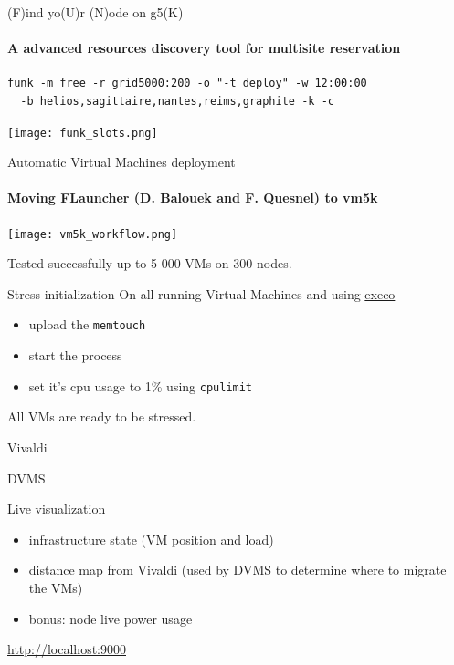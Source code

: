 \documentclass{beamer}
\begin{document}
\begin{frame}[fragile]{(F)ind yo(U)r (N)ode on g5(K)}
\framesubtitle{A advanced resources discovery tool for multisite reservation}
\small
\begin{verbatim}
funk -m free -r grid5000:200 -o "-t deploy" -w 12:00:00 
  -b helios,sagittaire,nantes,reims,graphite -k -c
\end{verbatim}
\begin{center}
\texttt{[image: funk\_slots.png]}
\end{center}
\end{frame}

 
\begin{frame}{Automatic Virtual Machines deployment}
\framesubtitle{Moving FLauncher (D. Balouek and F. Quesnel) to vm5k}
\begin{center}
\texttt{[image: vm5k\_workflow.png]}
\end{center}
\begin{alertblock}{}
Tested successfully up to 5 000 VMs on 300 nodes.
\end{alertblock}
\end{frame}

\begin{frame}[fragile]{Stress initialization}
On all running Virtual Machines and using \href{http://execo.gforge.inria.fr/doc/latest-stable/userguide.html}{execo}
\begin{itemize}
    \item upload the \verb=memtouch=
    \item start the process
    \item set it's cpu usage to 1\% using \verb=cpulimit=
\end{itemize}
\begin{alertblock}{}
All VMs are ready to be stressed.
\end{alertblock}

\end{frame}

\begin{frame}{Vivaldi}

\end{frame}

\begin{frame}{DVMS}

\end{frame}

\begin{frame}{Live visualization}
\begin{itemize}
    \item infrastructure state (VM position and load) 
    \item distance map from Vivaldi (used by DVMS to determine where to migrate the VMs)
    \item bonus: node live power usage
\end{itemize}
\begin{center}
\url{http://localhost:9000}
\end{center}
\end{frame}
    
\end{document}
